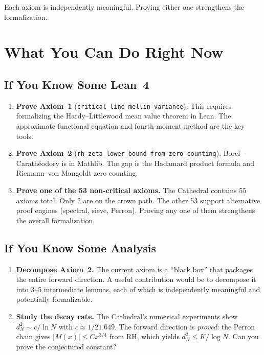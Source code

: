 \documentclass[11pt,a4paper]{article}
\begin{document}
Each axiom is independently meaningful. Proving either one
strengthens the formalization.

\section*{What You Can Do Right Now}

\subsection*{If You Know Some Lean~4}

\begin{enumerate}
  \item \textbf{Prove Axiom~1} (\texttt{critical\_line\_mellin\_variance}).
    This requires formalizing the Hardy--Littlewood mean value theorem
    in Lean. The approximate functional equation and fourth-moment
    method are the key tools.

  \item \textbf{Prove Axiom~2} (\texttt{rh\_zeta\_lower\_bound\_from\_zero\_counting}).
    Borel--Carath\'eodory is in Mathlib. The gap is the Hadamard
    product formula and Riemann--von Mangoldt zero counting.

  \item \textbf{Prove one of the 53 non-critical axioms.} The
    Cathedral contains 55 axioms total. Only 2 are on the crown
    path. The other 53 support alternative proof engines (spectral,
    sieve, Perron). Proving any one of them strengthens the
    overall formalization.
\end{enumerate}

\subsection*{If You Know Some Analysis}

\begin{enumerate}
  \item \textbf{Decompose Axiom~2.} The current axiom is a
    ``black box'' that packages the entire forward direction.
    A useful contribution would be to decompose it into 3--5
    intermediate lemmas, each of which is independently
    meaningful and potentially formalizable.

  \item \textbf{Study the decay rate.} The Cathedral's numerical
    experiments show $d_N^2 \sim c/\ln N$ with $c \approx
    1/21.649$. The forward direction is \emph{proved}: the Perron
    chain gives $|M(x)| \leq Cx^{3/4}$ from RH, which yields
    $d_N^2 \leq K/\log N$. Can you prove the conjectured constant?
\end{enumerate}
\end{document}
